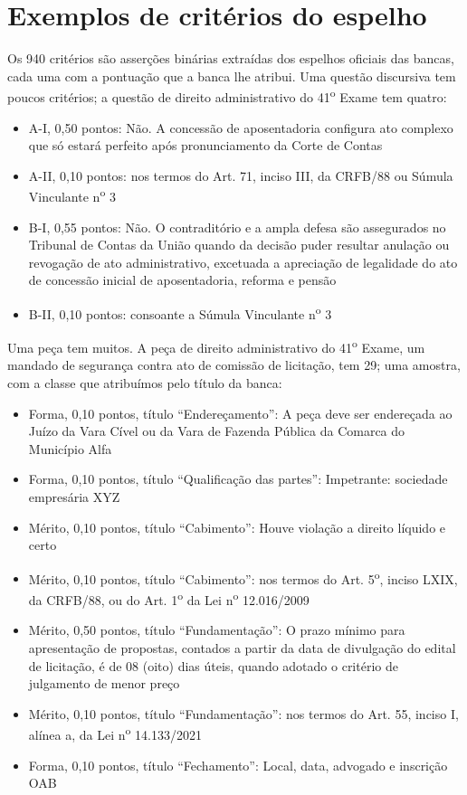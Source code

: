 \documentclass{IOS-Book-Article}
\begin{document}
\section{Exemplos de critérios do espelho}
Os 940 critérios são asserções binárias extraídas dos espelhos oficiais das bancas, cada uma com a pontuação que a banca lhe atribui. Uma questão discursiva tem poucos critérios; a questão de direito administrativo do 41\textsuperscript{o} Exame tem quatro:
\begin{itemize}
\item A-I, 0,50 pontos: Não. A concessão de aposentadoria configura ato complexo que só estará perfeito após pronunciamento da Corte de Contas
\item A-II, 0,10 pontos: nos termos do Art. 71, inciso III, da CRFB/88 ou Súmula Vinculante n\textsuperscript{o} 3
\item B-I, 0,55 pontos: Não. O contraditório e a ampla defesa são assegurados no Tribunal de Contas da União quando da decisão puder resultar anulação ou revogação de ato administrativo, excetuada a apreciação de legalidade do ato de concessão inicial de aposentadoria, reforma e pensão
\item B-II, 0,10 pontos: consoante a Súmula Vinculante n\textsuperscript{o} 3
\end{itemize}
Uma peça tem muitos. A peça de direito administrativo do 41\textsuperscript{o} Exame, um mandado de segurança contra ato de comissão de licitação, tem 29; uma amostra, com a classe que atribuímos pelo título da banca:
\begin{itemize}
\item Forma, 0,10 pontos, título “Endereçamento”: A peça deve ser endereçada ao Juízo da Vara Cível ou da Vara de Fazenda Pública da Comarca do Município Alfa
\item Forma, 0,10 pontos, título “Qualificação das partes”: Impetrante: sociedade empresária XYZ
\item Mérito, 0,10 pontos, título “Cabimento”: Houve violação a direito líquido e certo
\item Mérito, 0,10 pontos, título “Cabimento”: nos termos do Art. 5\textsuperscript{o}, inciso LXIX, da CRFB/88, ou do Art. 1\textsuperscript{o} da Lei n\textsuperscript{o} 12.016/2009
\item Mérito, 0,50 pontos, título “Fundamentação”: O prazo mínimo para apresentação de propostas, contados a partir da data de divulgação do edital de licitação, é de 08 (oito) dias úteis, quando adotado o critério de julgamento de menor preço
\item Mérito, 0,10 pontos, título “Fundamentação”: nos termos do Art. 55, inciso I, alínea a, da Lei n\textsuperscript{o} 14.133/2021
\item Forma, 0,10 pontos, título “Fechamento”: Local, data, advogado e inscrição OAB
\end{itemize}
\end{document}
